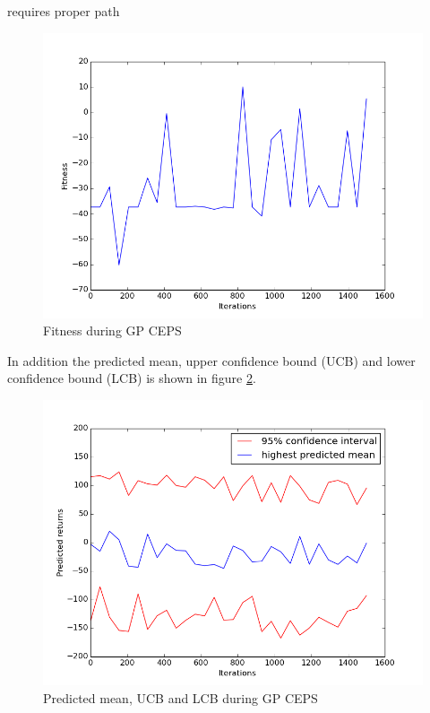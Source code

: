  requires proper path
\begin{figure}[ht]
  \centering
  \includegraphics[scale=0.5]{images/GPCEPS_True.png}
  \caption{Fitness during GP CEPS}\label{Fitness during GP CEPS}
\end{figure}

In addition the predicted mean, upper confidence bound (UCB) and lower confidence bound (LCB) is shown in figure \ref{pred_img}. 

\begin{figure}[ht]
  \centering
  \includegraphics[scale=0.5]{images/GPCEPS_pred.png}
  \caption{Predicted mean, UCB and LCB during GP CEPS}\label{pred_img}
\end{figure}


